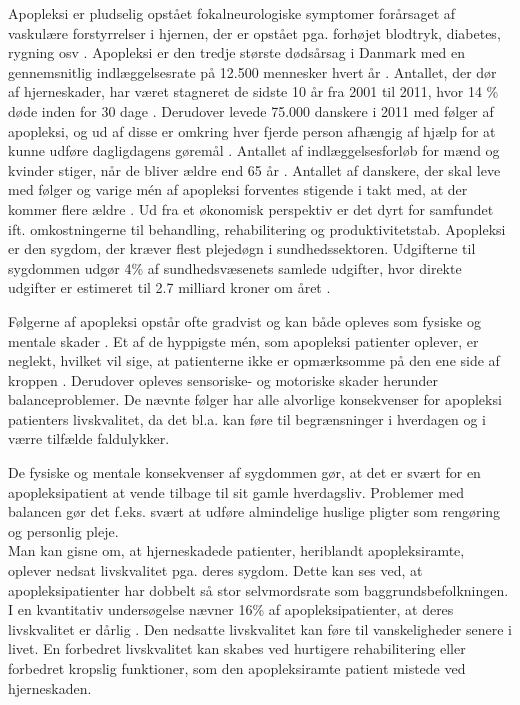 Apopleksi er pludselig opstået fokalneurologiske symptomer forårsaget af vaskulære forstyrrelser i hjernen, der er opstået pga. forhøjet blodtryk, diabetes, rygning osv \cite{Sundhedsstyrelsen2009,Academic2015}. Apopleksi er den tredje største dødsårsag i Danmark med en gennemsnitlig indlæggelsesrate på 12.500 mennesker hvert år \cite{Hjernesagen2015a}. Antallet, der dør af hjerneskader, har været stagneret de sidste 10 år fra 2001 til 2011, hvor 14 \% døde inden for 30 dage \cite{Hjernesagen2015}. Derudover levede 75.000 danskere i 2011 med følger af apopleksi, og ud af disse er omkring hver fjerde person afhængig af hjælp for at kunne udføre dagligdagens gøremål \cite{Hjernesagen2015a}. Antallet af indlæggelsesforløb for mænd og kvinder stiger, når de bliver ældre end 65 år \cite{Sundhedsstyrelsen2011}.
Antallet af danskere, der skal leve med følger og varige mén af apopleksi forventes stigende i takt med, at der kommer flere ældre \cite{Sagen2014}. Ud fra et økonomisk perspektiv er det dyrt for samfundet ift. omkostningerne til behandling, rehabilitering og produktivitetstab. Apopleksi er den sygdom, der kræver flest plejedøgn i sundhedssektoren. Udgifterne til sygdommen udgør 4\% af sundhedsvæsenets samlede udgifter, hvor direkte udgifter er estimeret til 2.7 milliard kroner om året \cite{Kruuse2014,Hjernesagen2015a}.
 
Følgerne af apopleksi opstår ofte gradvist og kan både opleves som fysiske og mentale skader \cite{Muus2008}. Et af de hyppigste mén, som apopleksi patienter oplever, er neglekt, hvilket vil sige, at patienterne ikke er opmærksomme på den ene side af kroppen \cite{Sundhed.dk}. Derudover opleves sensoriske- og motoriske skader herunder balanceproblemer. De nævnte følger har alle alvorlige konsekvenser for apopleksi patienters livskvalitet, da det bl.a. kan føre til  begrænsninger i hverdagen og i værre tilfælde faldulykker.\cite{Nichols1997,Muus2008}

De fysiske og mentale konsekvenser af sygdommen gør, at det er svært for en apopleksipatient at vende tilbage til sit gamle hverdagsliv. Problemer med balancen gør det f.eks. svært at udføre almindelige huslige pligter som rengøring og personlig pleje. \cite{Sundhedsstyrelsen2010} \\
Man kan gisne om, at hjerneskadede patienter, heriblandt apopleksiramte, oplever nedsat livskvalitet pga. deres sygdom. Dette kan ses ved, at apopleksipatienter har dobbelt så stor selvmordsrate som baggrundsbefolkningen. I en kvantitativ undersøgelse nævner 16\% af apopleksipatienter, at deres livskvalitet er dårlig \cite{Sundhedsstyrelsen2010}. Den nedsatte livskvalitet kan føre til vanskeligheder senere i livet. En forbedret livskvalitet kan skabes ved hurtigere rehabilitering eller forbedret kropslig funktioner, som den apopleksiramte patient mistede ved hjerneskaden.\cite{Sundhedsstyrelsen2010}

